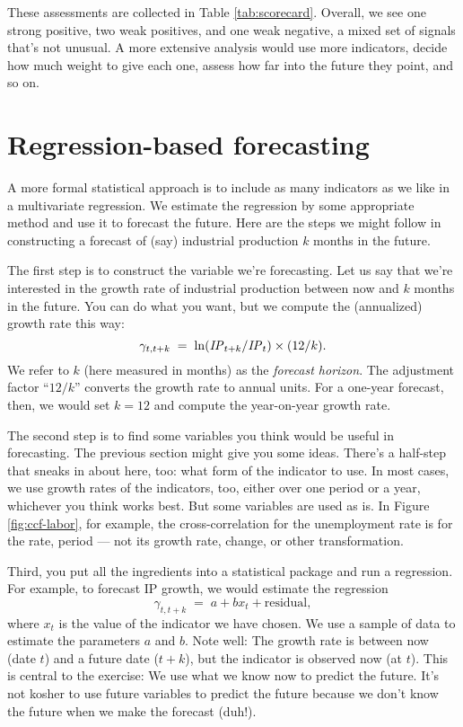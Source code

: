 These assessments are collected in Table \ref{tab:scorecard}.
Overall, we see one strong positive, two weak positives, and one weak negative,
a mixed set of signals that's not unusual.
A more extensive analysis would use more indicators,
decide how much weight to give each one,
assess how far into the future they point, and so on.


\section{Regression-based forecasting}

A more formal statistical approach is to include
as many indicators as we like in a multivariate regression.
We estimate the regression by some appropriate method
and use it to forecast the future.
Here are the steps we might follow in constructing a forecast
of (say) industrial production $k$ months in the future.

The first step is to construct the variable we're forecasting.
Let us say that we're interested in the growth rate of industrial
production between now and $k$ months in the future.
You can do what you want, but we compute the (annualized) growth
rate this way:
\[
    \gamma_{t,t+k} \;=\; \ln (\mbox{\em IP\/}_{t+k}/\mbox{\em IP\/}_t) \times (12/k) .
\]
We refer to $k$ (here measured in months) as the {\it forecast
horizon\/}.  The adjustment factor ``$12/k$'' converts the growth
rate to annual units.
For a one-year forecast, then, we would set $k=12$ and compute the
year-on-year growth rate.

The second step is to find some variables you think would be useful
in forecasting.
The previous section might give you some ideas.
There's a half-step that sneaks in about here, too:
what form of the indicator to use.
In most cases, we use growth rates of the indicators, too,
either over one period or a year,
whichever you think works best.
But some variables are used as is.
In Figure \ref{fig:ccf-labor}, for example,
the cross-correlation for the unemployment rate is for the rate, period --- not its growth rate, change, or other transformation.

Third, you put all the ingredients into a statistical package and run a regression.
For example, to forecast IP growth, we would estimate the regression
\[
        \gamma_{t,t+k}  \;=\;  a + b x_t + \mbox{residual},
\]
where $x_t$ is the value of the indicator we have chosen.
We use a sample of data to estimate the parameters $a$ and $b$.
Note well:  The growth rate is between now (date $t$)
and a future date ($t+k$),
but the indicator is observed now (at $t$).
This is central to the exercise:  We use what we know now
to predict the future.
It's not kosher to use future variables to predict the future
because we don't know the future when we make the forecast
(duh!).



